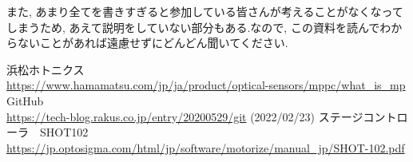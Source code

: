 \documentclass[uplatex,10pt,a4j]{jsarticle}
\begin{document}
また, あまり全てを書きすぎると参加している皆さんが考えることがなくなってしまうため, あえて説明をしていない部分もある.なので, この資料を読んでわからないことがあれば遠慮せずにどんどん聞いてください.

\begin{thebibliography}{9}
  浜松ホトニクス\\
  \url{https://www.hamamatsu.com/jp/ja/product/optical-sensors/mppc/what_is_mp}
  GitHub\\
  \url{https://tech-blog.rakus.co.jp/entry/20200529/git} (2022/02/23)
  ステージコントローラ　SHOT102\\
  \url{https://jp.optosigma.com/html/jp/software/motorize/manual_jp/SHOT-102.pdf}
\end{thebibliography}
\end{document}
